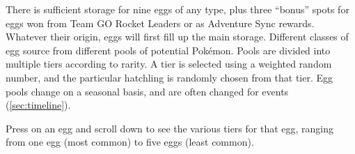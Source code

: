 There is sufficient storage for nine eggs of any type, plus three ``bonus''
 spots for eggs won from Team GO Rocket Leaders or as Adventure Sync rewards.
Whatever their origin, eggs will first fill up the main storage.
Different classes of egg source from different pools of potential Pokémon.
Pools are divided into multiple tiers according to rarity.
A tier is selected using a weighted random number, and the particular hatchling
 is randomly chosen from that tier.
Egg pools change on a seasonal basis, and are often changed for events (\autoref{sec:timeline}).
\begin{tipbox}[title=Seeing the egg pool]
Press on an egg and scroll down to see the various tiers for that egg, ranging
  from one egg (most common) to five eggs (least common).
\end{tipbox}

